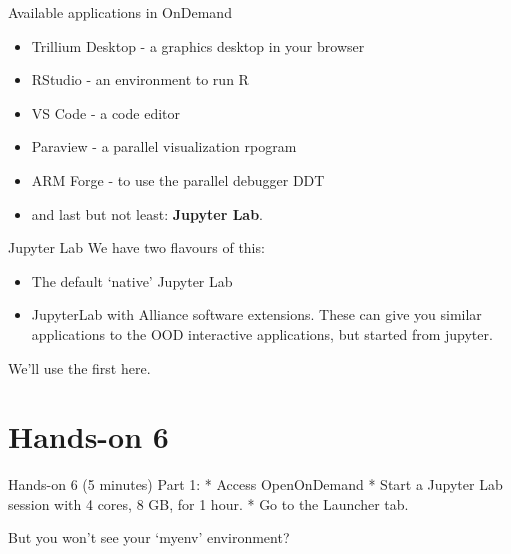 \documentclass[
  10pt,
  ignorenonframetext,
  aspectratio=169]{beamer}
\begin{document}
\begin{frame}{Available applications in OnDemand}
\label{available-applications-in-ondemand}
\begin{itemize}
\item
  Trillium Desktop - a graphics desktop in your browser

  \pause
\item
  RStudio - an environment to run R

  \pause
\item
  VS Code - a code editor

  \pause
\item
  Paraview - a parallel visualization rpogram

  \pause
\item
  ARM Forge - to use the parallel debugger DDT

  \pause
\item
  and last but not least: \textbf{Jupyter Lab}.
\end{itemize}
\end{frame}

\begin{frame}{Jupyter Lab}
\label{jupyter-lab}
We have two flavours of this:

\begin{itemize}
\item
  The default `native' Jupyter Lab
\item
  JupyterLab with Alliance software extensions. These can give you similar applications to the OOD interactive applications, but started from jupyter.
\end{itemize}

We'll use the first here.
\end{frame}

\section{Hands-on 6}\label{hands-on-6}

\begin{frame}{Hands-on 6 (5 minutes)}
\label{hands-on-6-5-minutes}
Part 1: * Access OpenOnDemand * Start a Jupyter Lab session with 4 cores, 8 GB, for 1 hour. * Go to the Launcher tab.

But you won't see your `myenv' environment?
\end{frame}
\end{document}
